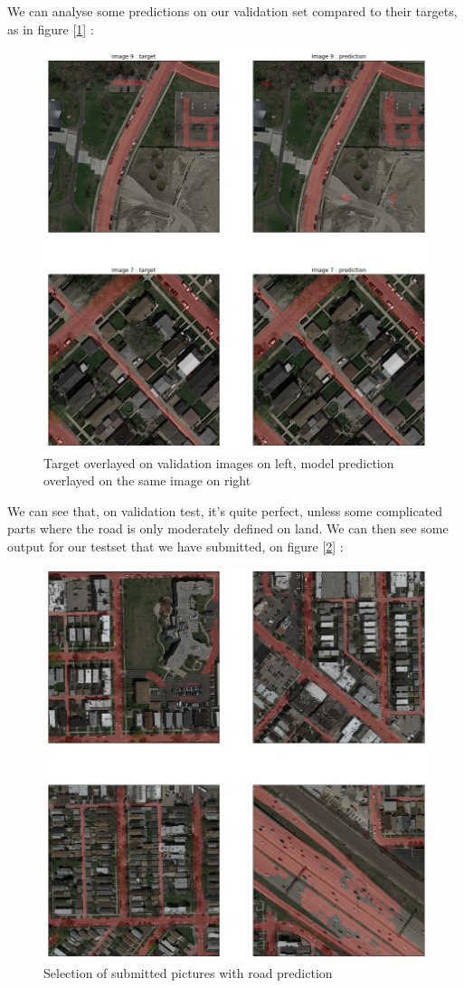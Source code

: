 \documentclass[10pt,conference,compsocconf]{IEEEtran}
\begin{document}
We can analyse some predictions on our validation set compared to their targets, as in figure [\ref{fig:prediction}] :
\FloatBarrier
\begin{figure}[ht] \centering
    \includegraphics[width=0.64\columnwidth]{figures/output.png}
    \caption{Target overlayed on validation images on left, model prediction overlayed on the same image on right}
    \label{fig:prediction}
\end{figure}
\FloatBarrier
We can see that, on validation test, it's quite perfect, unless some complicated parts where the road is only moderately defined on land. We can then see some output for our testset that we have submitted, on figure [\ref{fig:prediction_test}] : 
\FloatBarrier
\begin{figure}[ht] \centering
    \includegraphics[width=0.99\columnwidth]{figures/output_test.png}
    \caption{Selection of submitted pictures with road prediction}
    \label{fig:prediction_test}
\end{figure}
\FloatBarrier
\end{document}
